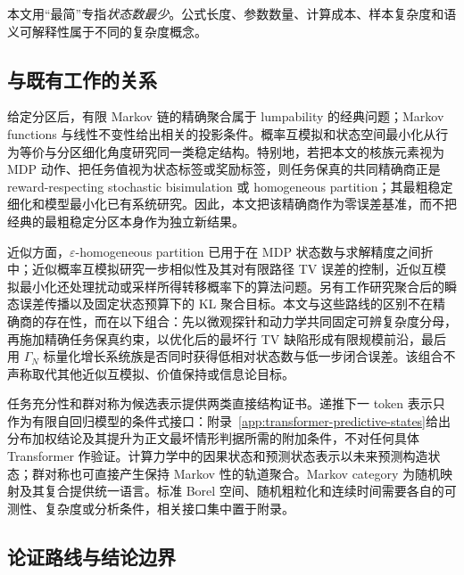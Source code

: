 本文用“最简”专指\emph{状态数最少}。公式长度、参数数量、计算成本、样本复杂度和语义可解释性属于不同的复杂度概念。

\subsection{与既有工作的关系}

给定分区后，有限 Markov 链的精确聚合属于 lumpability 的经典问题\citep{KemenySnell1976,Buchholz1994}；Markov functions 与线性不变性给出相关的投影条件\citep{RogersPitman1981,GurvitsLedoux2005}。概率互模拟和状态空间最小化从行为等价与分区细化角度研究同一类稳定结构\citep{LarsenSkou1991,DerisaviEtAl2003}。特别地，若把本文的核族元素视为 MDP 动作、把任务值视为状态标签或奖励标签，则任务保真的共同精确商正是 reward-respecting stochastic bisimulation 或 homogeneous partition；其最粗稳定细化和模型最小化已有系统研究\citep{GivanDeanGreig2003}。因此，本文把该精确商作为零误差基准，而不把经典的最粗稳定分区本身作为独立新结果。

近似方面，$\varepsilon$-homogeneous partition 已用于在 MDP 状态数与求解精度之间折中\citep{DeanGivanLeach1997}；近似概率互模拟研究一步相似性及其对有限路径 TV 误差的控制\citep{BianAbate2017}，近似互模拟最小化还处理扰动或采样所得转移概率下的算法问题\citep{KieferTang2021}。另有工作研究聚合后的瞬态误差传播\citep{MichelSiegle2025}以及固定状态预算下的 KL 聚合目标\citep{GeigerEtAl2015}。本文与这些路线的区别不在精确商的存在性，而在以下组合：先以微观探针和动力学共同固定可辨复杂度分母，再施加精确任务保真约束，以优化后的最坏行 TV 缺陷形成有限规模前沿，最后用 $\Gamma_N$ 标量化增长系统族是否同时获得低相对状态数与低一步闭合误差。该组合不声称取代其他近似互模拟、价值保持或信息论目标。

任务充分性和群对称为候选表示提供两类直接结构证书。递推下一 token 表示只作为有限自回归模型的条件式接口：附录~\ref{app:transformer-predictive-states}给出分布加权结论及其提升为正文最坏情形判据所需的附加条件，不对任何具体 Transformer 作验证。计算力学中的因果状态和预测状态表示以未来预测构造状态\citep{CrutchfieldYoung1989,ShaliziCrutchfield2001,LittmanSuttonSingh2001}；群对称也可直接产生保持 Markov 性的轨道聚合\citep{BanischLima2015}。Markov category 为随机映射及其复合提供统一语言\citep{Fritz2020}。标准 Borel 空间、随机粗粒化和连续时间需要各自的可测性、复杂度或分析条件，相关接口集中置于附录。

\subsection{论证路线与结论边界}

